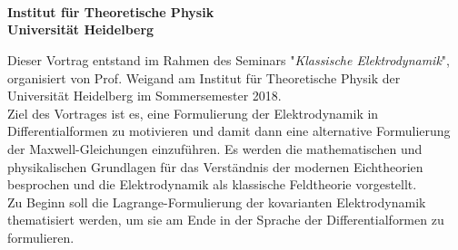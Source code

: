 \begin{center}

	\makeatletter
	\thispagestyle{plain}
	\LARGE\textbf{\@title} \\
	\vspace{2mm}
	\large\bfseries{\@author} \\
	\normalfont
	\vspace{2mm}
	\large{\@date} \\
	\vspace{2mm}
	\large{Institut für Theoretische Physik \\
		Universität Heidelberg} \\
	\makeatother
\end{center}

\normalsize

Dieser Vortrag entstand im Rahmen des Seminars "\textit{Klassische Elektrodynamik}", organisiert von Prof. Weigand am Institut für Theoretische Physik der Universität Heidelberg im Sommersemester 2018. \\
Ziel des Vortrages ist es, eine Formulierung der Elektrodynamik in Differentialformen zu motivieren und damit dann eine alternative Formulierung der Maxwell-Gleichungen einzuführen. Es werden die mathematischen und physikalischen Grundlagen für das Verständnis der modernen Eichtheorien besprochen und die Elektrodynamik als klassische Feldtheorie vorgestellt. \\
Zu Beginn soll die Lagrange-Formulierung der kovarianten Elektrodynamik thematisiert werden, um sie am Ende in der Sprache der Differentialformen zu formulieren.
